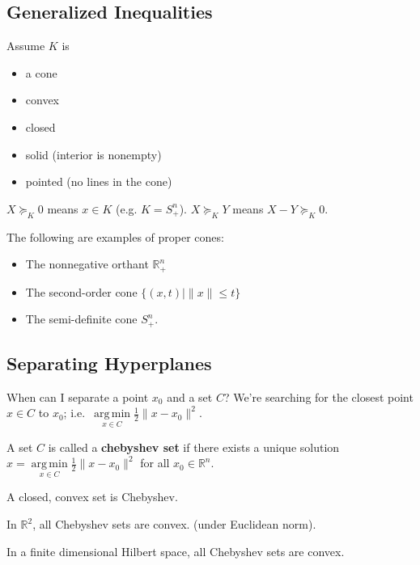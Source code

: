 \documentclass[english, 11pt]{article}
\DeclareMathOperator*{\argmin}{arg\,min}
\begin{document}
\subsection{Generalized Inequalities}
Assume $K$ is 
\begin{itemize}
\item a cone
\item convex
\item closed
\item solid (interior is nonempty)
\item pointed (no lines in the cone)
\end{itemize}
$X \succeq_K 0$ means $x \in K$ (e.g. $K = S_+^n$). $X \succeq_K Y$ means $X-Y \succeq_K 0$.


\begin{exmp}
The following are examples of proper cones:
\begin{itemize}

\item The nonnegative orthant $\mathbb{R}^n_+$
\item The second-order cone $\{(x,t) \mid \|x\| \le t \}$
\item The semi-definite cone $S^n_+$.
\end{itemize}
\end{exmp}

\subsection{Separating Hyperplanes}
When can I separate a point $x_0$ and a set $C$? We're searching for the closest point $x \in C$ to $x_0$; i.e.\ $\argmin \limits_{x \in C} \frac{1}{2} \|x-x_0\|^2$.

\begin{defn}
A set $C$ is called a {\bf chebyshev set} if there exists a unique solution $x=\argmin \limits_{x \in C} \frac{1}{2} \|x-x_0\|^2$ for all $x_0 \in \mathbb{R}^n$.
\end{defn}

\begin{rem}
A closed, convex set is Chebyshev.
\end{rem}

\begin{thrm}[Matzin]
In $\mathbb{R}^2$, all Chebyshev sets are convex. (under Euclidean norm).
\end{thrm}

\begin{thrm}
In a finite dimensional Hilbert space, all Chebyshev sets are convex.
\end{thrm}
\end{document}
